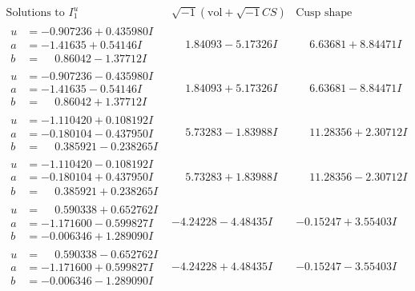 \documentclass[1p]{elsarticle_modified}
\theoremstyle{definition}
\newcommand{\I}{\sqrt{-1}}
\begin{document}
$$\begin{array}{c|c|c}  
\text{Solutions to }I^u_{1}& \I (\text{vol} + \sqrt{-1}CS) & \text{Cusp shape}\\
 \hline 
\begin{aligned}
u &= -0.907236 + 0.435980 I \\
a &= -1.41635 + 0.54146 I \\
b &= \phantom{-}0.86042 - 1.37712 I\end{aligned}
 & \phantom{-}1.84093 - 5.17326 I & \phantom{-}6.63681 + 8.84471 I \\ \hline\begin{aligned}
u &= -0.907236 - 0.435980 I \\
a &= -1.41635 - 0.54146 I \\
b &= \phantom{-}0.86042 + 1.37712 I\end{aligned}
 & \phantom{-}1.84093 + 5.17326 I & \phantom{-}6.63681 - 8.84471 I \\ \hline\begin{aligned}
u &= -1.110420 + 0.108192 I \\
a &= -0.180104 - 0.437950 I \\
b &= \phantom{-}0.385921 - 0.238265 I\end{aligned}
 & \phantom{-}5.73283 - 1.83988 I & \phantom{-}11.28356 + 2.30712 I \\ \hline\begin{aligned}
u &= -1.110420 - 0.108192 I \\
a &= -0.180104 + 0.437950 I \\
b &= \phantom{-}0.385921 + 0.238265 I\end{aligned}
 & \phantom{-}5.73283 + 1.83988 I & \phantom{-}11.28356 - 2.30712 I \\ \hline\begin{aligned}
u &= \phantom{-}0.590338 + 0.652762 I \\
a &= -1.171600 - 0.599827 I \\
b &= -0.006346 + 1.289090 I\end{aligned}
 & -4.24228 - 4.48435 I & -0.15247 + 3.55403 I \\ \hline\begin{aligned}
u &= \phantom{-}0.590338 - 0.652762 I \\
a &= -1.171600 + 0.599827 I \\
b &= -0.006346 - 1.289090 I\end{aligned}
 & -4.24228 + 4.48435 I & -0.15247 - 3.55403 I \\ \hline\begin{aligned}

\end{aligned}
\end{array}$$
\end{document}
